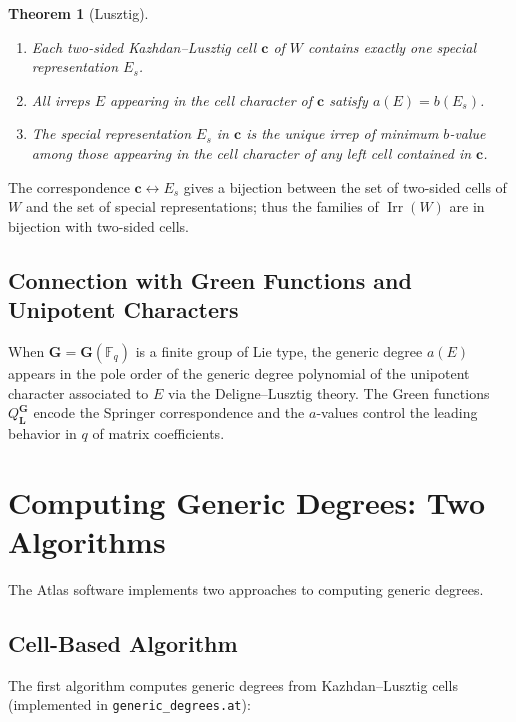 \documentclass[12pt]{amsart}
\newtheorem{theorem}{Theorem}[section]
\newcommand{\Irr}{\operatorname{Irr}}
\newcommand{\FF}{\mathbb{F}}
\newcommand{\bfG}{\mathbf{G}}
\newcommand{\bfL}{\mathbf{L}}
\begin{document}
\begin{theorem}[Lusztig]
  \begin{enumerate}
    \item Each two-sided Kazhdan--Lusztig cell $\mathbf{c}$ of $W$ contains
          exactly one special representation $E_s$.
    \item All irreps $E$ appearing in the cell character of $\mathbf{c}$ satisfy
          $a(E) = b(E_s)$.
    \item The special representation $E_s$ in $\mathbf{c}$ is the unique irrep
          of minimum $b$-value among those appearing in the cell character of
          any left cell contained in $\mathbf{c}$.
  \end{enumerate}
\end{theorem}

The correspondence $\mathbf{c} \leftrightarrow E_s$ gives a bijection between
the set of two-sided cells of $W$ and the set of special representations; thus
the families of $\Irr(W)$ are in bijection with two-sided cells.

\subsection{Connection with Green Functions and Unipotent Characters}

When $\bfG = \bfG(\FF_q)$ is a finite group of Lie type, the generic degree
$a(E)$ appears in the pole order of the generic degree polynomial of the
unipotent character associated to $E$ via the Deligne--Lusztig theory.  The
Green functions $Q^{\bfG}_\bfL$ encode the Springer correspondence and the
$a$-values control the leading behavior in $q$ of matrix coefficients.

\section{Computing Generic Degrees: Two Algorithms}

The Atlas software implements two approaches to computing generic degrees.

\subsection{Cell-Based Algorithm}

The first algorithm computes generic degrees from Kazhdan--Lusztig cells
(implemented in \texttt{generic\_degrees.at}):
\end{document}
